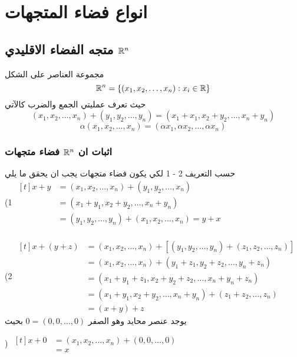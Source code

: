 \chapter{انواع فضاء المتجهات}

\section[متجه الفضاء الاقليدي $\R^n$]{متجه الفضاء الاقليدي $\R^n$ \cite{key3}}
مجموعة العناصر على الشكل
\[
\mathbb{R}^n = \{(x_1, x_2, \dots, x_n) : x_i \in \mathbb{R}\}
\]
حيث تعرف عمليتي الجمع والضرب كالآتي
\[
(x_1, x_2, \dots, x_n) + (y_1, y_2, \dots, y_n)  = (x_1+x_1, x_2+y_2, \dots, x_n+y_n) 
\]  
\[
\alpha (x_1, x_2, \dots, x_n)  = (\alpha x_1,\alpha x_2, \dots, \alpha x_n) 
\]



\subsection*{اثبات ان $\R^n$ فضاء متجهات}
حسب التعريف 2 - 1 لكي يكون فضاء متجهات يجب ان يحقق ما يلي\\

\setLR
\noindent
(1 $
\begin{aligned}[t]
	x + y &= (x_1, x_2, \dots, x_n) + (y_1, y_2, \dots, x_n)\\
	&= (x_1+y_1, x_2+y_2, \dots, x_n + y_n)\\
	&= (y_1, y_2, \dots, y_n) + (x_1, x_2, \dots, x_n) = y + x
\end{aligned}
$\\ \\
(2 $
\begin{aligned}[t]
	x + (y + z) &= (x_1, x_2, \dots, x_n) + [(y_1, y_2, \dots, y_n) + (z_1, z_2, \dots, z_n)]\\
	&= (x_1, x_2, \dots, x_n) + (y_1+z_1, y_2+z_2, \dots, y_n+z_n)\\
	&=  (x_1+y_1+z_1, x_2+y_2+z_2, \dots, x_n+y_n+z_n)\\
	&=  (x_1+y_1, x_2+y_2, \dots, x_n+y_n) + (z_1+z_2,\dots,z_n)\\
	&= (x+y) + z
\end{aligned}
$\\

\noindent
يوجد عنصر محايد وهو الصفر $0 = (0, 0, \dots, 0)$ بحيث

) $
\begin{aligned}[t]
	x + 0 &= (x_1,x_2,\dots,x_n) + (0, 0, \dots, 0)\\
	&= x
\end{aligned}
$\\

